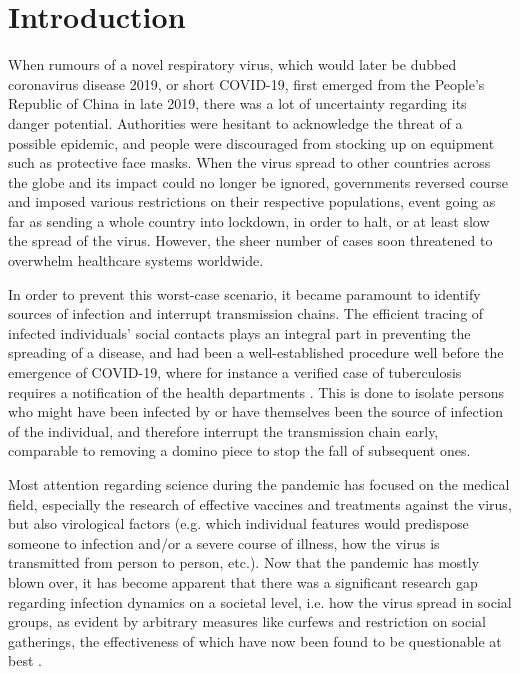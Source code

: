\chapter{Introduction}
\label{ch:Introduction}

When rumours of a novel respiratory virus, which would later be dubbed coronavirus disease 2019, or short COVID-19, first emerged from the People's Republic of China in late 2019, there was a lot of uncertainty regarding its danger potential. Authorities were hesitant to acknowledge the threat of a possible epidemic, and people were discouraged from stocking up on equipment such as protective face masks. When the virus spread to other countries across the globe and its impact could no longer be ignored, governments reversed course and imposed various restrictions on their respective populations, event going as far as sending a whole country into lockdown, in order to halt, or at least slow the spread of the virus. However, the sheer number of cases soon threatened to overwhelm healthcare systems worldwide.

In order to prevent this worst-case scenario, it became paramount to identify sources of infection and interrupt transmission chains. The efficient tracing of infected individuals' social contacts plays an integral part in preventing the spreading of a disease, and had been a well-established procedure well before the emergence of COVID-19, where for instance a verified case of tuberculosis requires a notification of the health departments \cite{enwiki_1097839709}. This is done to isolate persons who might have been infected by or have themselves been the source of infection of the individual, and therefore interrupt the transmission chain early, comparable to removing a domino piece to stop the fall of subsequent ones.

Most attention regarding science during the pandemic has focused on the medical field, especially the research of effective vaccines and treatments against the virus, but also virological factors (e.g. which individual features would predispose someone to infection and/or a severe course of illness, how the virus is transmitted from person to person, etc.). Now that the pandemic has mostly blown over, it has become apparent that there was a significant research gap regarding infection dynamics on a societal level, i.e. how the virus spread in social groups, as evident by arbitrary measures like curfews and restriction on social gatherings, the effectiveness of which have now been found to be questionable at best .

